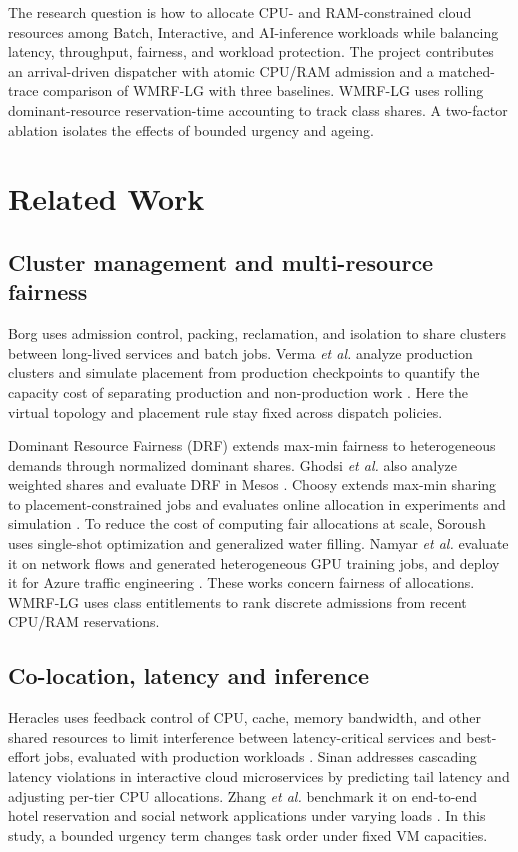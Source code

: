 \documentclass[conference]{IEEEtran}
\newcommand{\wmrf}{WMRF-LG}
\begin{document}
The research question is how to allocate CPU- and RAM-constrained cloud resources among Batch, Interactive, and AI-inference workloads while balancing latency, throughput, fairness, and workload protection. The project contributes an arrival-driven dispatcher with atomic CPU/RAM admission and a matched-trace comparison of \wmrf{} with three baselines. \wmrf{} uses rolling dominant-resource reservation-time accounting to track class shares. A two-factor ablation isolates the effects of bounded urgency and ageing.

\section{Related Work}
\subsection{Cluster management and multi-resource fairness}
Borg uses admission control, packing, reclamation, and isolation to share clusters between long-lived services and batch jobs. Verma \emph{et al.} analyze production clusters and simulate placement from production checkpoints to quantify the capacity cost of separating production and non-production work \cite{verma2015borg}. Here the virtual topology and placement rule stay fixed across dispatch policies.

Dominant Resource Fairness (DRF) extends max-min fairness to heterogeneous demands through normalized dominant shares. Ghodsi \emph{et al.} also analyze weighted shares and evaluate DRF in Mesos \cite{ghodsi2011drf}. Choosy extends max-min sharing to placement-constrained jobs and evaluates online allocation in experiments and simulation \cite{ghodsi2013choosy}. To reduce the cost of computing fair allocations at scale, Soroush uses single-shot optimization and generalized water filling. Namyar \emph{et al.} evaluate it on network flows and generated heterogeneous GPU training jobs, and deploy it for Azure traffic engineering \cite{namyar2024soroush}. These works concern fairness of allocations. \wmrf{} uses class entitlements to rank discrete admissions from recent CPU/RAM reservations.

\subsection{Co-location, latency and inference}
Heracles uses feedback control of CPU, cache, memory bandwidth, and other shared resources to limit interference between latency-critical services and best-effort jobs, evaluated with production workloads \cite{lo2015heracles}. Sinan addresses cascading latency violations in interactive cloud microservices by predicting tail latency and adjusting per-tier CPU allocations. Zhang \emph{et al.} benchmark it on end-to-end hotel reservation and social network applications under varying loads \cite{zhang2021sinan}. In this study, a bounded urgency term changes task order under fixed VM capacities.
\end{document}
